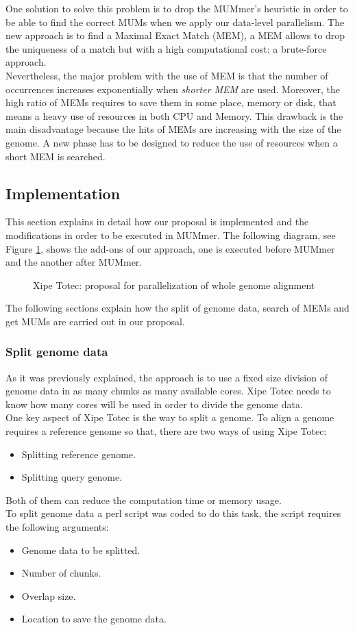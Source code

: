 \documentclass[10pt]{bmc_article}
\newenvironment{bmcformat}{\begin{raggedright}\baselineskip20pt\sloppy\setboolean{publ}{false}}{\end{raggedright}\baselineskip20pt\sloppy}
\begin{document}
\begin{bmcformat}
One solution to solve this problem is to drop the MUMmer's heuristic in order to be able to find the correct MUMs when we apply our data-level parallelism. The new approach is to find a Maximal Exact Match (MEM), a MEM allows to drop the uniqueness of a match but with a high computational cost: a brute-force approach.\\
Nevertheless, the major problem with the use of MEM is that the number of occurrences increases exponentially when \emph{shorter MEM} are used. Moreover, the high ratio of MEMs requires to save them in some place, memory or disk, that means a heavy use of resources in both CPU and Memory. This drawback is the main disadvantage because the hits of MEMs are increasing with the size of the genome. A new phase has to be designed to reduce the use of resources when a short MEM is searched.
\subsection*{Implementation} 
\label{implementation}
This section explains in detail how our proposal is implemented and the modifications in order to be executed in MUMmer. The following diagram, see Figure \ref{xipe-totec}, shows the add-ons of our approach, one is executed before MUMmer and the another after MUMmer.
\begin{figure}[htb]  
 \begin{center} 
 \end{center}
 \caption{Xipe Totec: proposal for parallelization of whole genome alignment} 
 \label{xipe-totec} 
\end{figure}
The following sections explain how the split of genome data, search of MEMs and get MUMs are carried out in our proposal.
\subsubsection*{Split genome data} 
As it was previously explained, the approach is to use a fixed size division of genome data in as many chunks as  many available cores. Xipe Totec needs to know how many cores will be used in order to divide the genome data.\\
One key aspect of Xipe Totec is the way to split a genome. To align a genome requires a reference genome so that, there are two ways of using Xipe Totec:
\begin{itemize}
\item Splitting reference genome.
\item Splitting query genome.
\end{itemize}
Both of them can reduce the computation time or memory usage.\\
To split genome data a perl script was coded to do this task, the script requires the following arguments:
\begin{itemize}
\item Genome data to be splitted.
\item Number of chunks.
\item Overlap size.
\item Location to save the genome data.
\end{itemize}

\end{bmcformat}
\end{document}
